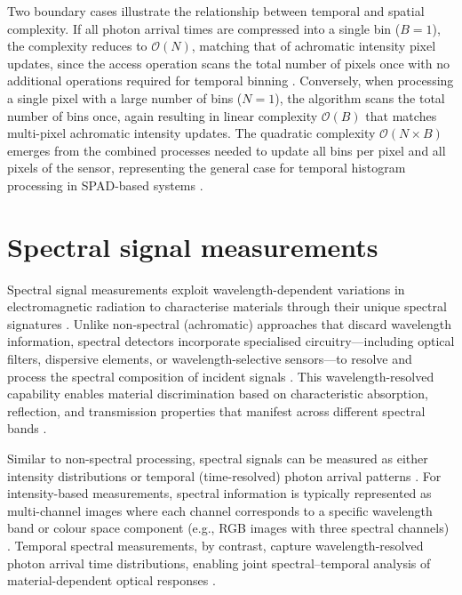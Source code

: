 \documentclass[12pt,a4paper,oneside]{report}
\let\oldsection\section
\renewcommand{\section}{\clearpage\oldsection}
\begin{document}
Two boundary cases illustrate the relationship between temporal and spatial complexity. If all photon arrival times are compressed into a single bin ($B = 1$), the complexity reduces to $\mathcal{O}(N)$, matching that of achromatic intensity pixel updates, since the access operation scans the total number of pixels once with no additional operations required for temporal binning \cite{knuth1976}. Conversely, when processing a single pixel with a large number of bins ($N = 1$), the algorithm scans the total number of bins once, again resulting in linear complexity $\mathcal{O}(B)$ that matches multi-pixel achromatic intensity updates. The quadratic complexity $\mathcal{O}(N \times B)$ emerges from the combined processes needed to update all bins per pixel and all pixels of the sensor, representing the general case for temporal histogram processing in SPAD-based systems \cite{hutchings2019,zhang2019}.

\newpage
\section{Spectral signal measurements}
\label{sec:spectral_signal_measurements}

Spectral signal measurements exploit wavelength-dependent variations in electromagnetic radiation to characterise materials through their unique spectral signatures \cite{elachi2021,schott2007}. Unlike non-spectral (achromatic) approaches that discard wavelength information, spectral detectors incorporate specialised circuitry—including optical filters, dispersive elements, or wavelength-selective sensors—to resolve and process the spectral composition of incident signals \cite{heinz2001,vasile2023}. This wavelength-resolved capability enables material discrimination based on characteristic absorption, reflection, and transmission properties that manifest across different spectral bands \cite{elachi2021,inagaki2020}.

Similar to non-spectral processing, spectral signals can be measured as either intensity distributions or temporal (time-resolved) photon arrival patterns \cite{moramartin2021,inagaki2020}. For intensity-based measurements, spectral information is typically represented as multi-channel images where each channel corresponds to a specific wavelength band or colour space component (e.g., RGB images with three spectral channels) \cite{schott2007}. Temporal spectral measurements, by contrast, capture wavelength-resolved photon arrival time distributions, enabling joint spectral–temporal analysis of material-dependent optical responses \cite{inagaki2020}.
\end{document}

